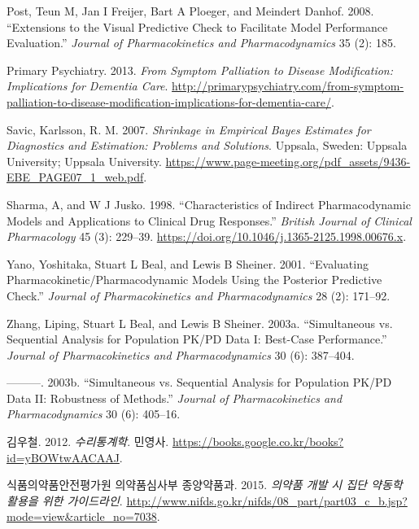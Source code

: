 \documentclass[
  11pt,
  krantz2,
  a4paper]{krantz}
\newlength{\cslhangindent}
\newenvironment{cslreferences}%
  {\setlength{\parindent}{0pt}%
  \everypar{\setlength{\hangindent}{\cslhangindent}}\ignorespaces}%
  {\par}
\theoremstyle{definition}
\theoremstyle{definition}
\theoremstyle{definition}
\theoremstyle{remark}
\begin{document}
\begin{cslreferences}
\leavevmode\hypertarget{ref-post2008extensions}{}%
Post, Teun M, Jan I Freijer, Bart A Ploeger, and Meindert Danhof. 2008. ``Extensions to the Visual Predictive Check to Facilitate Model Performance Evaluation.'' \emph{Journal of Pharmacokinetics and Pharmacodynamics} 35 (2): 185.

\leavevmode\hypertarget{ref-dementia}{}%
Primary Psychiatry. 2013. \emph{From Symptom Palliation to Disease Modification: Implications for Dementia Care}. \url{http://primarypsychiatry.com/from-symptom-palliation-to-disease-modification-implications-for-dementia-care/}.

\leavevmode\hypertarget{ref-uppsala}{}%
Savic, Karlsson, R. M. 2007. \emph{Shrinkage in Empirical Bayes Estimates for Diagnostics and Estimation: Problems and Solutions}. Uppsala, Sweden: Uppsala University; Uppsala University. \url{https://www.page-meeting.org/pdf_assets/9436-EBE_PAGE07_1_web.pdf}.

\leavevmode\hypertarget{ref-sharma1998characteristics}{}%
Sharma, A, and W J Jusko. 1998. ``Characteristics of Indirect Pharmacodynamic Models and Applications to Clinical Drug Responses.'' \emph{British Journal of Clinical Pharmacology} 45 (3): 229--39. \url{https://doi.org/10.1046/j.1365-2125.1998.00676.x}.

\leavevmode\hypertarget{ref-yano2001evaluating}{}%
Yano, Yoshitaka, Stuart L Beal, and Lewis B Sheiner. 2001. ``Evaluating Pharmacokinetic/Pharmacodynamic Models Using the Posterior Predictive Check.'' \emph{Journal of Pharmacokinetics and Pharmacodynamics} 28 (2): 171--92.

\leavevmode\hypertarget{ref-zhang1}{}%
Zhang, Liping, Stuart L Beal, and Lewis B Sheiner. 2003a. ``Simultaneous vs. Sequential Analysis for Population PK/PD Data I: Best-Case Performance.'' \emph{Journal of Pharmacokinetics and Pharmacodynamics} 30 (6): 387--404.

\leavevmode\hypertarget{ref-zhang2}{}%
---------. 2003b. ``Simultaneous vs. Sequential Analysis for Population PK/PD Data II: Robustness of Methods.'' \emph{Journal of Pharmacokinetics and Pharmacodynamics} 30 (6): 405--16.

\leavevmode\hypertarget{ref-kim}{}%
김우철. 2012. \emph{수리통계학}. 민영사. \url{https://books.google.co.kr/books?id=yBOWtwAACAAJ}.

\leavevmode\hypertarget{ref-poppk}{}%
식품의약품안전평가원 의약품심사부 종양약품과. 2015. \emph{의약품 개발 시 집단 약동학 활용을 위한 가이드라인}. \url{http://www.nifds.go.kr/nifds/08_part/part03_c_b.jsp?mode=view\&article_no=7038}.
\end{cslreferences}

\printindex
\end{document}
